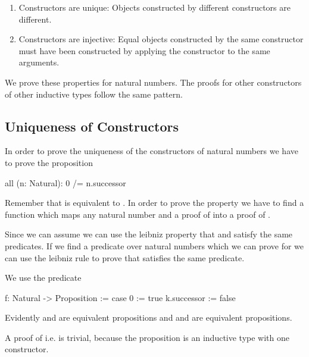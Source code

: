 \begin{enumerate}

\item Constructors are unique: Objects constructed by
different constructors are different.

\item Constructors are injective: Equal objects constructed by the same
constructor must have been constructed by applying the constructor to the same
arguments.

\end{enumerate}

We prove these properties for natural numbers. The proofs for other constructors
of other inductive types follow the same pattern.




\subsection{Uniqueness of Constructors}

In order to prove the uniqueness of the constructors of natural numbers we have
to prove the proposition

\begin{alba}
    all (n: Natural): 0 /= n.successor
\end{alba}

Remember that  is equivalent to . In order to prove the property we have to find a function which
maps any natural number  and a proof of  into a
proof of .

Since we can assume  we can use the leibniz property that
 and  satisfy the same predicates. If we find a
predicate over natural numbers which we can prove for  we can use the
leibniz rule to prove that  satisfies the same predicate.

We use the predicate
\begin{alba}
    f: Natural -> Proposition :=
        case
            0 :=
                true
            k.successor :=
                false
\end{alba}

Evidently  and  are equivalent propositions and  and  are equivalent propositions.

A proof of  i.e.  is trivial, because the proposition
 is an inductive type with one constructor.

